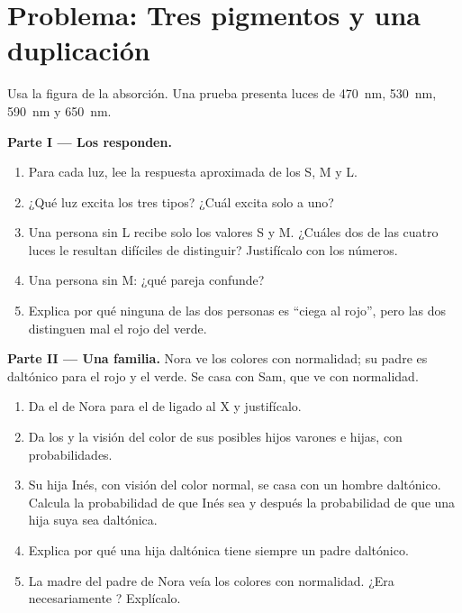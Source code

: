 \section{Problema: Tres pigmentos y una duplicación}

\begin{problem}
\label{pb:g11:the-eye:1}
Usa la figura de la absorción. Una prueba presenta luces de
\qty{470}{nm}, \qty{530}{nm}, \qty{590}{nm} y \qty{650}{nm}.

\medskip
\noindent\textbf{Parte I --- Los  responden.}
\begin{enumerate}
  \item Para cada luz, lee la respuesta aproximada de los  S, M y
        L.
  \item ¿Qué luz excita los tres tipos? ¿Cuál excita solo a uno?
  \item Una persona sin  L recibe solo los valores S y M. ¿Cuáles
        dos de las cuatro luces le resultan difíciles de distinguir?
        Justifícalo con los números.
  \item Una persona sin  M: ¿qué pareja confunde?
  \item Explica por qué ninguna de las dos personas es ``ciega al
        rojo'', pero las dos distinguen mal el rojo del verde.
\end{enumerate}

\medskip
\noindent\textbf{Parte II --- Una familia.}
Nora ve los colores con normalidad; su padre es daltónico para el rojo
y el verde. Se casa con Sam, que ve con normalidad.
\begin{enumerate}[resume]
  \item Da el  de Nora para el  de  ligado al X y
        justifícalo.
  \item Da los  y la visión del color de sus posibles hijos
        varones e hijas, con probabilidades.
  \item Su hija Inés, con visión del color normal, se casa con un
        hombre daltónico. Calcula la probabilidad de que Inés sea
         y después la probabilidad de que una hija suya sea
        daltónica.
  \item Explica por qué una hija daltónica tiene siempre un padre
        daltónico.
  \item La madre del padre de Nora veía los colores con normalidad.
        ¿Era necesariamente ? Explícalo.
\end{enumerate}


\end{problem}

